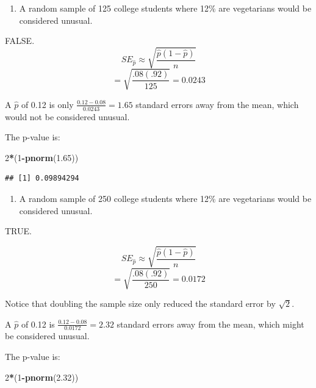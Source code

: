 \documentclass[
]{book}
\newenvironment{Shaded}{\begin{snugshade}}{\end{snugshade}}
\newcommand{\DecValTok}[1]{\textcolor[rgb]{0.00,0.00,0.81}{#1}}
\newcommand{\FloatTok}[1]{\textcolor[rgb]{0.00,0.00,0.81}{#1}}
\newcommand{\KeywordTok}[1]{\textcolor[rgb]{0.13,0.29,0.53}{\textbf{#1}}}
\newcommand{\NormalTok}[1]{#1}
\newcommand{\OperatorTok}[1]{\textcolor[rgb]{0.81,0.36,0.00}{\textbf{#1}}}
\providecommand{\tightlist}{%
  \setlength{\itemsep}{0pt}\setlength{\parskip}{0pt}}
\begin{document}
\begin{enumerate}
\def\labelenumi{\alph{enumi}.}
\setcounter{enumi}{2}
\tightlist
\item
  A random sample of 125 college students where 12\% are vegetarians would be considered unusual.
\end{enumerate}

FALSE.
\[ SE_{\hat{p}}
    \approx \sqrt{\frac{\hat{p}(1-\hat{p})}{n}}\]
\[=\sqrt{\frac{.08(.92)}{125}} = 0.0243\]

A \(\hat{p}\) of 0.12 is only \(\frac{0.12 - 0.08}{0.0243} = 1.65\) standard errors away from the mean, which would not be considered unusual.

The p-value is:

\begin{Shaded}
\begin{Highlighting}[]
\DecValTok{2}\OperatorTok{*}\NormalTok{(}\DecValTok{1}\OperatorTok{-}\KeywordTok{pnorm}\NormalTok{(}\FloatTok{1.65}\NormalTok{))}
\end{Highlighting}
\end{Shaded}

\begin{verbatim}
## [1] 0.09894294
\end{verbatim}

\begin{enumerate}
\def\labelenumi{\alph{enumi}.}
\setcounter{enumi}{3}
\tightlist
\item
  A random sample of 250 college students where 12\% are vegetarians would be considered unusual.
\end{enumerate}

TRUE.

\[ SE_{\hat{p}}
    \approx \sqrt{\frac{\hat{p}(1-\hat{p})}{n}}\]
\[=\sqrt{\frac{.08(.92)}{250}} = 0.0172\]

Notice that doubling the sample size only reduced the standard error by \(\sqrt{2}\).

A \(\hat{p}\) of 0.12 is \(\frac{0.12 - 0.08}{0.0172} = 2.32\) standard errors away from the mean, which might be considered unusual.

The p-value is:

\begin{Shaded}
\begin{Highlighting}[]
\DecValTok{2}\OperatorTok{*}\NormalTok{(}\DecValTok{1}\OperatorTok{-}\KeywordTok{pnorm}\NormalTok{(}\FloatTok{2.32}\NormalTok{))}
\end{Highlighting}
\end{Shaded}
\end{document}
